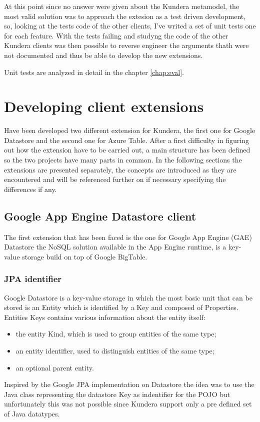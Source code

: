 \noindent At this point since no answer were given about the Kundera metamodel, the most valid solution was to approach the extesion as a test driven development, so, looking at the tests code of the other clients, I've writed a set of unit tests one for each feature.
With the tests failing and studyng the code of the other Kundera clients was then possible to reverse engineer the arguments thath were not documented and thus be able to develop the new extensions.

\newparagraph Unit tests are analyzed in detail in the chapter \ref{chap:eval}.

\section{Developing client extensions}
Have been developed two different extension for Kundera, the first one for Google Datastore and the second one for Azure Table.
After a first difficulty in figuring out how the extension have to be carried out, a main structure has been defined so the two projects have many parts in common. 
In the following sections the extensions are presented separately, the concepts are introduced as they are encountered and will be referenced further on if necessary specifying the differences if any.

\subsection{Google App Engine Datastore client}
\label{sec:kundera-datastore}
The first extension that has been faced is the one for Google App Engine (GAE) Datastore \cite{online:datastore} the NoSQL solution available in the App Engine runtime, is a key-value storage build on top of Google BigTable.

\subsubsection{JPA identifier}
Google Datastore is a key-value storage in which the most basic unit that can be stored is an Entity which is identified by a Key and composed of Properties.
Entities Keys contains various information about the entity itself:
\begin{itemize}
\item the entity Kind, which is used to group entities of the same type;
\item an entity identifier, used to distinguish entities of the same type;
\item an optional parent entity. 
\end{itemize}
Inspired by the Google JPA implementation on Datastore the idea was to use the Java class representing the datastore Key as indentifier for the POJO but unfortunately this was not possible since Kundera support only a pre defined set of Java datatypes.

